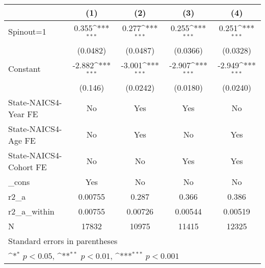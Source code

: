 {
\def\sym#1{\ifmmode^{#1}\else\(^{#1}\)\fi}
\begin{tabular}{l*{4}{c}}
\hline\hline
                    &\multicolumn{1}{c}{(1)}         &\multicolumn{1}{c}{(2)}         &\multicolumn{1}{c}{(3)}         &\multicolumn{1}{c}{(4)}         \\
\hline
Spinout=1           &       0.355\sym{***}&       0.277\sym{***}&       0.255\sym{***}&       0.251\sym{***}\\
                    &    (0.0482)         &    (0.0487)         &    (0.0366)         &    (0.0328)         \\
[1em]
Constant            &      -2.882\sym{***}&      -3.001\sym{***}&      -2.907\sym{***}&      -2.949\sym{***}\\
                    &     (0.146)         &    (0.0242)         &    (0.0180)         &    (0.0240)         \\
[1em]
State-NAICS4-Year FE&          No         &         Yes         &         Yes         &          No         \\
[1em]
State-NAICS4-Age FE &          No         &         Yes         &          No         &         Yes         \\
[1em]
State-NAICS4-Cohort FE&          No         &          No         &         Yes         &         Yes         \\
[1em]
\_cons              &         Yes         &          No         &          No         &          No         \\
\hline
r2\_a                &     0.00755         &       0.287         &       0.366         &       0.386         \\
r2\_a\_within         &     0.00755         &     0.00726         &     0.00544         &     0.00519         \\
N                   &       17832         &       10975         &       11415         &       12325         \\
\hline\hline
\multicolumn{5}{l}{\footnotesize Standard errors in parentheses}\\
\multicolumn{5}{l}{\footnotesize \sym{*} \(p<0.05\), \sym{**} \(p<0.01\), \sym{***} \(p<0.001\)}\\
\end{tabular}
}
